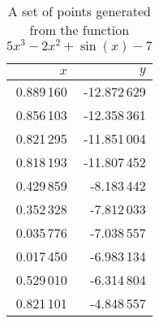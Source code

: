 \begin{table}[ht!]
  \centering
  \begin{tabular}{|r|r|}
    \hline
    \(x\)	& \(y\)	\\
    \hline
    \hline
    0.889\,160	& -12.872\,629	\\
    \hline
    0.856\,103	& -12.358\,361	\\
    \hline
    0.821\,295	& -11.851\,004	\\
    \hline
    0.818\,193	& -11.807\,452	\\
    \hline
    0.429\,859	& -8.183\,442	\\
    \hline
    0.352\,328	& -7.812\,033	\\
    \hline
    0.035\,776	& -7.038\,557	\\
    \hline
    0.017\,450	& -6.983\,134	\\
    \hline
    0.529\,010	& -6.314\,804	\\
    \hline
    0.821\,101	& -4.848\,557	\\
    \hline
  \end{tabular}
  \caption{A set of points generated from the function \(5x^3 - 2x^2 + \sin(x) - 7\)}
  \label{tab:bg:gp:repr_ev:points}
\end{table}